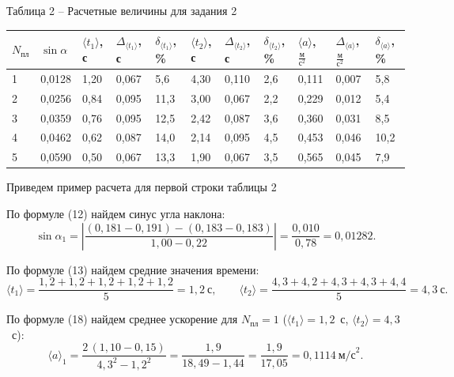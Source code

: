 \documentclass[12pt,a4paper]{article}
\renewcommand{\arraystretch}{1.25}
\begin{document}
\begin{center}
\begin{minipage}{\linewidth}\centering
\renewcommand{\arraystretch}{1.12}
Таблица 2 – Расчетные величины для задания 2\\[3pt]
\setlength{\tabcolsep}{2.5pt}\begin{tabular}{|C{0.9cm}|C{1.32cm}|C{1.32cm}|C{1.32cm}|C{1.32cm}|C{1.32cm}|C{1.32cm}|C{1.32cm}|C{1.32cm}|C{1.32cm}|C{1.32cm}|}
\hline
$N_\text{пл}$ & $\sin\alpha$ & $\langle t_1\rangle$, с & $\Delta_{\langle t_1\rangle}$, с & $\delta_{\langle t_1\rangle}$, \% & $\langle t_2\rangle$, с & $\Delta_{\langle t_2\rangle}$, с & $\delta_{\langle t_2\rangle}$, \% & $\langle a\rangle$, $\frac{\text{м}}{\text{с}^2}$ & $\Delta_{\langle a\rangle}$, $\frac{\text{м}}{\text{с}^2}$ & $\delta_{\langle a\rangle}$, \% \\  & 0{,}0128 & 1{,}20 & 0{,}067 & 5{,}6 & 4{,}30 & 0{,}110 & 2{,}6 & 0{,}111 & 0{,}007 & 5{,}8 \\  & 0{,}0256 & 0{,}84 & 0{,}095 & 11{,}3 & 3{,}00 & 0{,}067 & 2{,}2 & 0{,}229 & 0{,}012 & 5{,}4 \\  & 0{,}0359 & 0{,}76 & 0{,}095 & 12{,}5 & 2{,}42 & 0{,}087 & 3{,}6 & 0{,}360 & 0{,}031 & 8{,}5 \\  & 0{,}0462 & 0{,}62 & 0{,}087 & 14{,}0 & 2{,}14 & 0{,}095 & 4{,}5 & 0{,}453 & 0{,}046 & 10{,}2 \\  & 0{,}0590 & 0{,}50 & 0{,}067 & 13{,}3 & 1{,}90 & 0{,}067 & 3{,}5 & 0{,}565 & 0{,}045 & 7{,}9 \\ \hline
\end{tabular}
\end{minipage}
\end{center}
Приведем пример расчета для первой строки таблицы 2

По формуле (12) найдем синус угла наклона:
\[
\sin\alpha_1 = \left|\frac{(0{,}181 - 0{,}191) - (0{,}183 - 0{,}183)}{1{,}00 - 0{,}22}\right| = \frac{0{,}010}{0{,}78} = 0{,}01282.
\]

По формуле (13) найдем средние значения времени:
\[
\langle t_1\rangle = \frac{1{,}2 + 1{,}2 + 1{,}2 + 1{,}2 + 1{,}2}{5} = 1{,}2\ \text{с}, \qquad
\langle t_2\rangle = \frac{4{,}3 + 4{,}2 + 4{,}3 + 4{,}3 + 4{,}4}{5} = 4{,}3\ \text{с}.
\]

По формуле (18) найдем среднее ускорение для $N_\text{пл} = 1$ ($\langle t_1\rangle = 1{,}2$~с, $\langle t_2\rangle = 4{,}3$~с):
\[
\langle a\rangle_1 = \frac{2\,(1{,}10 - 0{,}15)}{4{,}3^2 - 1{,}2^2} = \frac{1{,}9}{18{,}49 - 1{,}44} = \frac{1{,}9}{17{,}05} = 0{,}1114\ \text{м/с}^2.
\]
\end{document}
